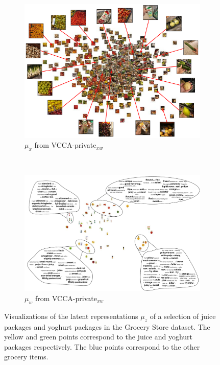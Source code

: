 \begin{figure}[!tp]
\begin{subfigure}[b]{0.49\textwidth}
         \label{fig:pca_vcca_private_xw_z}
     \end{subfigure} \\
     \begin{subfigure}[b]{0.6\textwidth}
         \centering
         \includegraphics[width=\textwidth]{PaperB/figures_and_tables/private_latent_space_visualizations/vcca_private_ux_space.pdf}
         \caption{$\mu_{x}$ from VCCA-private$_{x w}$}
         \label{fig:pca_vcca_private_xw_ux}
     \end{subfigure} \\
     \begin{subfigure}[b]{0.7\textwidth}
         \centering
         \includegraphics[width=\textwidth]{PaperB/figures_and_tables/private_latent_space_visualizations/vcca_private_uw_space.pdf}
         \caption{$\mu_{w}$ from VCCA-private$_{x w}$}
         \label{fig:pca_vcca_private_xw_uw}
     \end{subfigure} 
    \caption{Visualizations of the latent representations $\mu_{z}$ of a selection of juice packages and yoghurt packages in the Grocery Store dataset. The yellow and green points correspond to the juice and yoghurt packages respectively. The blue points correspond to the other grocery items. 
    }
    \label{fig:2d_visualizations_pca_vcca_private_xw}
\end{figure}